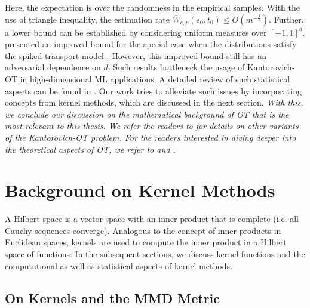 Here, the expectation is over the randomness in the empirical samples. With the use of triangle inequality, the estimation rate $\bar{W}_{c, p}(s_0, t_0)\leq O(m^{-\frac{1}{d}})$. Further, a lower bound can be established by considering uniform measures over $[-1, 1]^d$. \cite{nilesweed2019estimation} presented an improved bound for the special case when the distributions satisfy the spiked transport model \citep[Eq. (2)]{nilesweed2019estimation}. However, this improved bound still has an adversarial dependence on $d$. Such results bottleneck the usage of Kantorovich-OT in high-dimensional ML applications. A detailed review of such statistical aspects can be found in \cite{Chewi2024StatisticalOT}. Our work tries to alleviate such issues by incorporating concepts from kernel methods, which are discussed in the next section.
\newline
\newline
\textit{With this, we conclude our discussion on the mathematical background of OT that is the most relevant to this thesis.
We refer the readers to \cite{peyre2019computational} for details on other variants of the Kantorovich-OT problem. For the readers interested in diving deeper into the theoretical aspects of OT, we refer to \cite{villanioldnew,santab} and \cite{Chewi2024StatisticalOT}.}
\section{Background on Kernel Methods}
A Hilbert space is a vector space with an inner product that is complete (i.e. all Cauchy sequences converge). Analogous to the concept of inner products in Euclidean spaces, kernels are used to compute the inner product in a Hilbert space of functions. In the subsequent sections, we discuss kernel functions and the computational as well as statistical aspects of kernel methods.
\subsection{On Kernels and the MMD Metric}\label{bg:kme}
\stoptoc
